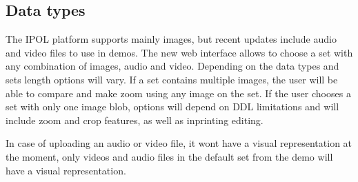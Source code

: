 
\subsection{Data types}
The IPOL platform supports mainly images, but recent updates include audio and video files to use in demos. The new web interface 
allows to choose a set with any combination of images, audio and video. Depending on the data types and sets length options will vary. 
If a set contains multiple images, the user will be able to compare and make zoom using any image on the set. If the user chooses a set with only 
one image blob, options will depend on DDL limitations and will include zoom and crop features, as well as inprinting editing.

In case of uploading an audio or video file, it wont have a visual representation at the moment, only videos and audio files in the default set from the demo will have a visual representation.